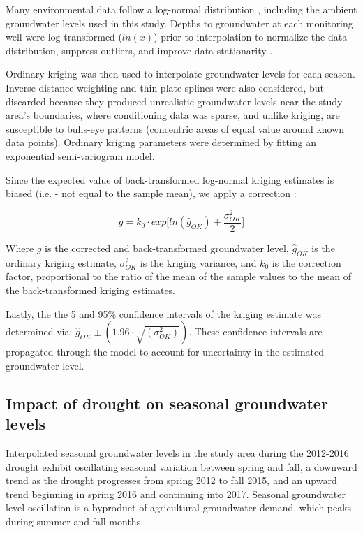 Many environmental data follow a log-normal distribution \cite{Stedinger1980}, including the ambient groundwater levels used in this study. Depths to groundwater at each monitoring well were log transformed ($ln(x)$) prior to interpolation to normalize the data distribution, suppress outliers, and improve data stationarity \cite{DeutschC.V.andJournel1992, Varouchakis2012}. 

Ordinary kriging was then used to interpolate groundwater levels for each season. Inverse distance weighting and thin plate splines were also considered, but discarded because they produced unrealistic groundwater levels near the study area's boundaries, where conditioning data was sparse, and unlike kriging, are susceptible to bulls-eye patterns (concentric areas of equal value around known data points).  
Ordinary kriging parameters were determined by fitting an exponential semi-variogram model. 

Since the expected value of back-transformed log-normal kriging estimates is biased (i.e. - not equal to the sample mean), we apply a correction \cite{Laurent1963, JournelA.G.Huijbregts1978}:  

\begin{equation}
    g = k_0 \cdot exp \Big[ ln(\hat{g}_{OK}) + \frac{\sigma^2_{OK}}{2} \Big]
\end{equation}

Where $g$ is the corrected and back-transformed groundwater level, $\hat{g}_{OK}$ is the ordinary kriging estimate, $\sigma^2_{OK}$ is the kriging variance, and $k_0$ is the correction factor, proportional to the ratio of the mean of the sample values to the mean of the back-transformed kriging estimates.  

Lastly, the the 5 and 95\% confidence intervals of the kriging estimate was determined via: $\hat{g}_{OK} \pm (1.96 \cdot \sqrt{(\sigma^2_{OK})})$. These confidence intervals are propagated through the model to account for uncertainty in the estimated groundwater level.   


\subsection{Impact of drought on seasonal groundwater levels}
\label{ap_a_drought_impact}

Interpolated seasonal groundwater levels in the study area during the 2012-2016 drought exhibit oscillating seasonal variation between spring and fall, a downward trend as the drought progresses from spring 2012 to fall 2015, and an upward trend beginning in spring 2016 and continuing into 2017. Seasonal groundwater level oscillation is a byproduct of agricultural groundwater demand, which peaks during summer and fall months. 

